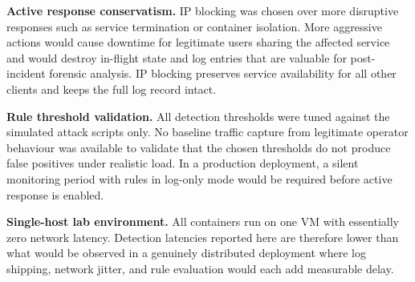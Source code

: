 \textbf{Active response conservatism.} IP blocking was chosen over more
disruptive responses such as service termination or container isolation.
More aggressive actions would cause downtime for legitimate users sharing
the affected service and would destroy in-flight state and log entries that
are valuable for post-incident forensic analysis. IP blocking preserves service
availability for all other clients and keeps the full log record intact.

\textbf{Rule threshold validation.} All detection thresholds were tuned against
the simulated attack scripts only. No baseline traffic capture from legitimate
operator behaviour was available to validate that the chosen thresholds do not
produce false positives under realistic load. In a production deployment, a
silent monitoring period with rules in log-only mode would be required before
active response is enabled.

\textbf{Single-host lab environment.} All containers run on one VM with
essentially zero network latency. Detection latencies reported here are therefore
lower than what would be observed in a genuinely distributed deployment where
log shipping, network jitter, and rule evaluation would each add measurable delay.
